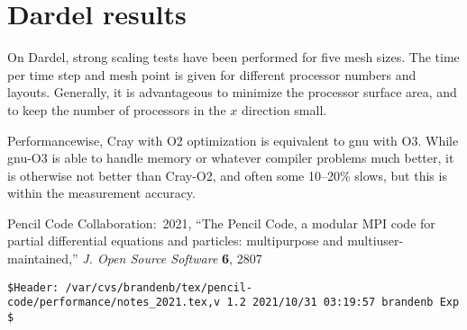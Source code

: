 \documentclass[twocolumn]{article}
\newcommand{\yjourN}[5]{:~#1, ``#5,'' {\em #2} {\bf #3}, #4}
\begin{document}
\section{Dardel results}

On Dardel, strong scaling tests have been performed
for five mesh sizes.
The time per time step and mesh point is given for
different processor numbers and layouts.
Generally, it is advantageous to minimize the
processor surface area, and to keep the number
of processors in the $x$ direction small.

Performancewise, Cray with O2 optimization is equivalent to gnu with O3.
While gnu-O3 is able to handle memory or whatever compiler problems much
better, it is otherwise not better than Cray-O2, and often some 10--20\%
slows, but this is within the measurement accuracy.

\begin{thebibliography}{}

Pencil Code Collaboration\yjourN{2021}{J. Open Source Software}{6}{2807}
{The Pencil Code, a modular MPI code for partial differential equations and particles: multipurpose and multiuser-maintained}

\end{thebibliography}

\vfill\bigskip\noindent\tiny\begin{verbatim}
$Header: /var/cvs/brandenb/tex/pencil-code/performance/notes_2021.tex,v 1.2 2021/10/31 03:19:57 brandenb Exp $
\end{verbatim}
\end{document}
